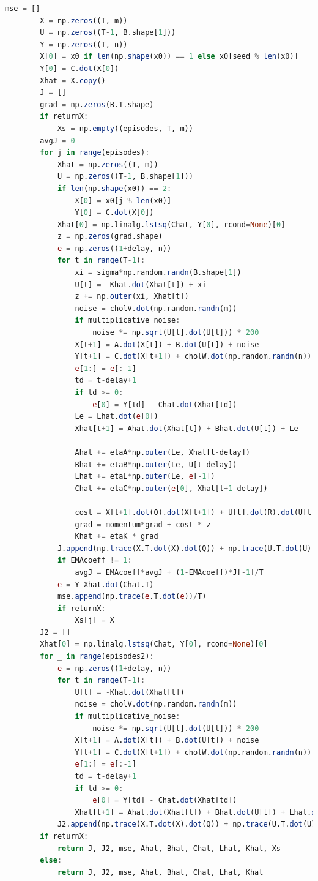 \begin{lstlisting}[language=julia]
        mse = []
        X = np.zeros((T, m))
        U = np.zeros((T-1, B.shape[1]))
        Y = np.zeros((T, n))
        X[0] = x0 if len(np.shape(x0)) == 1 else x0[seed % len(x0)]
        Y[0] = C.dot(X[0])
        Xhat = X.copy()
        J = []
        grad = np.zeros(B.T.shape)
        if returnX:
            Xs = np.empty((episodes, T, m))
        avgJ = 0
        for j in range(episodes):
            Xhat = np.zeros((T, m))
            U = np.zeros((T-1, B.shape[1]))
            if len(np.shape(x0)) == 2:
                X[0] = x0[j % len(x0)]
                Y[0] = C.dot(X[0])
            Xhat[0] = np.linalg.lstsq(Chat, Y[0], rcond=None)[0]
            z = np.zeros(grad.shape)
            e = np.zeros((1+delay, n))
            for t in range(T-1):
                xi = sigma*np.random.randn(B.shape[1])
                U[t] = -Khat.dot(Xhat[t]) + xi
                z += np.outer(xi, Xhat[t])
                noise = cholV.dot(np.random.randn(m))
                if multiplicative_noise:
                    noise *= np.sqrt(U[t].dot(U[t])) * 200
                X[t+1] = A.dot(X[t]) + B.dot(U[t]) + noise
                Y[t+1] = C.dot(X[t+1]) + cholW.dot(np.random.randn(n))
                e[1:] = e[:-1]
                td = t-delay+1
                if td >= 0:
                    e[0] = Y[td] - Chat.dot(Xhat[td])
                Le = Lhat.dot(e[0])
                Xhat[t+1] = Ahat.dot(Xhat[t]) + Bhat.dot(U[t]) + Le

                Ahat += etaA*np.outer(Le, Xhat[t-delay])
                Bhat += etaB*np.outer(Le, U[t-delay])
                Lhat += etaL*np.outer(Le, e[-1])
                Chat += etaC*np.outer(e[0], Xhat[t+1-delay])

                cost = X[t+1].dot(Q).dot(X[t+1]) + U[t].dot(R).dot(U[t]) - avgJ
                grad = momentum*grad + cost * z
                Khat += etaK * grad
            J.append(np.trace(X.T.dot(X).dot(Q)) + np.trace(U.T.dot(U).dot(R)))
            if EMAcoeff != 1:
                avgJ = EMAcoeff*avgJ + (1-EMAcoeff)*J[-1]/T
            e = Y-Xhat.dot(Chat.T)
            mse.append(np.trace(e.T.dot(e))/T)
            if returnX:
                Xs[j] = X
        J2 = []
        Xhat[0] = np.linalg.lstsq(Chat, Y[0], rcond=None)[0]
        for _ in range(episodes2):
            e = np.zeros((1+delay, n))
            for t in range(T-1):
                U[t] = -Khat.dot(Xhat[t])
                noise = cholV.dot(np.random.randn(m))
                if multiplicative_noise:
                    noise *= np.sqrt(U[t].dot(U[t])) * 200
                X[t+1] = A.dot(X[t]) + B.dot(U[t]) + noise
                Y[t+1] = C.dot(X[t+1]) + cholW.dot(np.random.randn(n))
                e[1:] = e[:-1]
                td = t-delay+1
                if td >= 0:
                    e[0] = Y[td] - Chat.dot(Xhat[td])
                Xhat[t+1] = Ahat.dot(Xhat[t]) + Bhat.dot(U[t]) + Lhat.dot(e[0])
            J2.append(np.trace(X.T.dot(X).dot(Q)) + np.trace(U.T.dot(U).dot(R)))
        if returnX:
            return J, J2, mse, Ahat, Bhat, Chat, Lhat, Khat, Xs
        else:
            return J, J2, mse, Ahat, Bhat, Chat, Lhat, Khat
\end{lstlisting}
